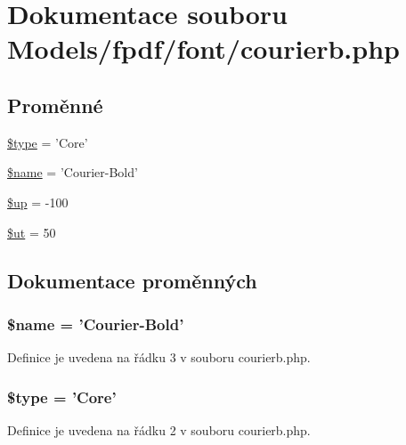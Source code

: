 \hypertarget{courierb_8php}{\section{Dokumentace souboru Models/fpdf/font/courierb.php}
\label{courierb_8php}
}
\subsection*{Proměnné}
\begin{DoxyCompactItemize}
\item 
\hyperlink{courierb_8php_a9a4a6fba2208984cabb3afacadf33919}{\$type} = 'Core'
\item 
\hyperlink{courierb_8php_ab2fc40d43824ea3e1ce5d86dee0d763b}{\$name} = 'Courier-\/Bold'
\item 
\hyperlink{courierb_8php_a6b5ad2ac55f9df46e8f34e78fbd6f176}{\$up} = -\/100
\item 
\hyperlink{courierb_8php_aadd3f841051043ee58e587e840e8dd0b}{\$ut} = 50
\end{DoxyCompactItemize}


\subsection{Dokumentace proměnných}
\hypertarget{courierb_8php_ab2fc40d43824ea3e1ce5d86dee0d763b}{
\subsubsection[{\$name}]{\setlength{\rightskip}{0pt plus 5cm}\$name = 'Courier-\/Bold'}}\label{courierb_8php_ab2fc40d43824ea3e1ce5d86dee0d763b}


Definice je uvedena na řádku 3 v souboru courierb.\-php.

\hypertarget{courierb_8php_a9a4a6fba2208984cabb3afacadf33919}{
\subsubsection[{\$type}]{\setlength{\rightskip}{0pt plus 5cm}\$type = 'Core'}}\label{courierb_8php_a9a4a6fba2208984cabb3afacadf33919}


Definice je uvedena na řádku 2 v souboru courierb.\-php.

